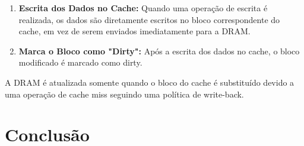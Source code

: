\documentclass{article}
\begin{document}
\begin{enumerate}
    \item \textbf{Escrita dos Dados no Cache:} Quando uma operação de escrita é realizada, os dados são diretamente escritos no bloco correspondente do cache, em vez de serem enviados imediatamente para a DRAM.

    \item \textbf{Marca o Bloco como "Dirty":} Após a escrita dos dados no cache, o bloco modificado é marcado como dirty.


\end{enumerate}
A DRAM é atualizada somente quando o bloco do cache é substituído devido a uma operação de cache miss seguindo uma política de write-back. 

\section{Conclusão}
\end{document}
